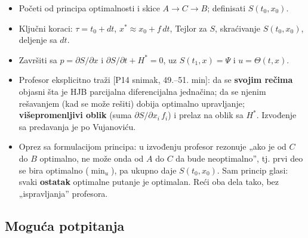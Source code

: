 \documentclass[11pt,a4paper,parskip=half,headsepline,numbers=noenddot]{scrartcl}
\DeclareRobustCommand{\izvor}[1]{{\small\color{izvorC}[#1]}}
\begin{document}
\begin{ispit}[{Pitanje 9}]
\begin{itemize}
\item Početi od principa optimalnosti i skice \(A \to C \to B\); definisati \(S(t_0, x_0)\).
\item Ključni koraci: \(\tau = t_0 + dt\), \(x^* \approx x_0 + f\,dt\), Tejlor za \(S\), skraćivanje \(S(t_0, x_0)\), deljenje sa \(dt\).
\item Završiti sa \(p = \partial S/\partial x\) i \(\partial S/\partial t + H^* = 0\), uz \(S(t_1, x) = \Psi\) i \(u = \Theta(t, x)\).
\item Profesor eksplicitno traži \izvor{P14 snimak, 49.--51. min}: da se \textbf{svojim rečima} objasni šta je HJB parcijalna diferencijalna jednačina; da se njenim rešavanjem (kad se može rešiti) dobija optimalno upravljanje; \textbf{višepromenljivi oblik} (suma \(\partial S/\partial x_i\,f_i\)) i prelaz na oblik sa \(H^*\). Izvođenje sa predavanja je po Vujanoviću.
\item Oprez sa formulacijom principa: u izvođenju profesor rezonuje „ako je od \(C\) do \(B\) optimalno, ne može onda od \(A\) do \(C\) da bude neoptimalno'', tj. prvi deo se bira optimalno (\(\min_u\)), pa ukupno daje \(S(t_0, x_0)\). Sam princip glasi: svaki \textbf{ostatak} optimalne putanje je optimalan. Reći oba dela tako, bez „ispravljanja'' profesora.
\end{itemize}
\end{ispit}

\subsection{Moguća potpitanja}
\end{document}
